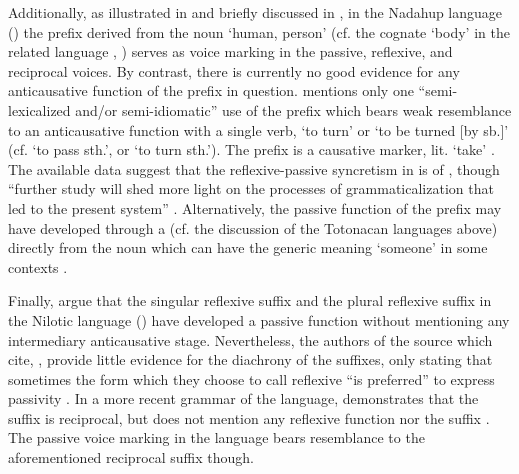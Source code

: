 Additionally, as illustrated in  and briefly discussed in , in the Nadahup language  () the prefix  derived from the noun  ‘human, person’ (cf. the cognate  ‘body’ in the related language , \citealt[486]{epps:2008}) serves as voice marking in the passive, reflexive, and reciprocal voices. By contrast, there is currently no good evidence for any anticausative function of the prefix in question. \citet[314, 476]{epps:2008} mentions only one “semi-lexicalized and/or semi-idiomatic” use of the prefix which bears weak resemblance to an anticausative function with a single verb,  ‘to turn’ or ‘to be turned [by sb.]’ (cf.  ‘to pass sth.’,  or  ‘to turn sth.’). The prefix  is a causative marker, lit. ‘take’ \citep[518]{epps:2008}. The available data suggest that the reflexive-passive syncretism in  is of , though “further study will shed more light on the processes of grammaticalization that led to the present system” \citep[487]{epps:2008}. Alternatively, the passive function of the prefix  may have developed through a  (cf. the discussion of the Totonacan languages above) directly from the noun  which can have the generic meaning ‘someone’ in some contexts \citep[479]{epps:2008}.

Finally, \citet[253]{heine:kuteva:2002} argue that the singular reflexive suffix  and the plural reflexive suffix  in the Nilotic language  () have developed a passive function without mentioning any intermediary anticausative stage. Nevertheless, the authors of the source which \citeauthor{heine:kuteva:2002} cite, \citet{hilders:lawrance:1956}, provide little evidence for the diachrony of the suffixes, only stating that sometimes the form which they choose to call reflexive “is preferred” to express passivity \citep[57]{hilders:lawrance:1956}. In a more recent grammar of the language, \citet[175ff.]{barasa:2017} demonstrates that the suffix  is reciprocal, but does not mention any reflexive function nor the suffix . The passive voice marking  \citep[171ff.]{barasa:2017} in the language bears resemblance to the aforementioned reciprocal suffix though. 

